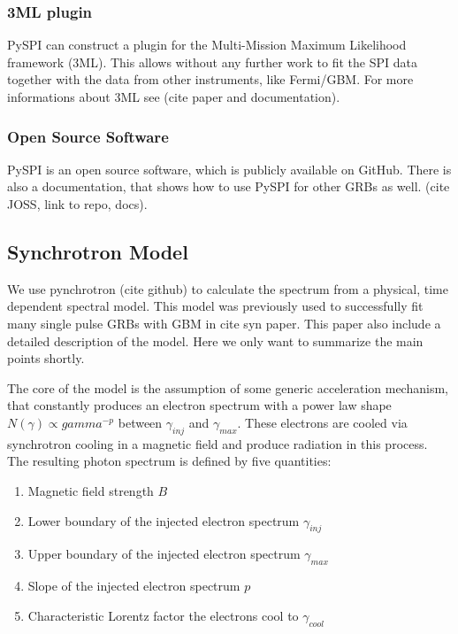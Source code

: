 \documentclass[modern]{aastex631}
\begin{document}
\subsubsection*{3ML plugin}

PySPI can construct a plugin for the Multi-Mission Maximum Likelihood framework (3ML). This allows without any further work to fit the SPI data together with the data from other instruments, like Fermi/GBM. For more informations about 3ML see (cite paper and documentation).

\subsubsection*{Open Source Software}

PySPI is an open source software, which is publicly available on GitHub. There is also a documentation, that shows how to use PySPI for other GRBs as well. (cite JOSS, link to repo, docs).

\subsection{Synchrotron Model}

We use pynchrotron (cite github) to calculate the spectrum from a physical, time dependent spectral model. This model was previously used to successfully fit many single pulse GRBs with GBM in cite syn paper. This paper also include a detailed description of the model. Here we only want to summarize the main points shortly.

The core of the model is the assumption of some generic acceleration mechanism, that constantly produces an electron spectrum with a power law shape $N(\gamma )\propto gamma^{-p}$ between $\gamma_{inj}$ and $\gamma_{max}$. These electrons are cooled via synchrotron cooling in a magnetic field and produce radiation in this process. The resulting photon spectrum is defined by five quantities:

\begin{enumerate}
	\item Magnetic field strength $B$
  \item Lower boundary of the injected electron spectrum $\gamma_{inj}$
  \item Upper boundary of the injected electron spectrum $\gamma_{max}$
  \item Slope of the injected electron spectrum $p$
  \item Characteristic Lorentz factor the electrons cool to $\gamma_{cool}$
\end{enumerate}
\end{document}
